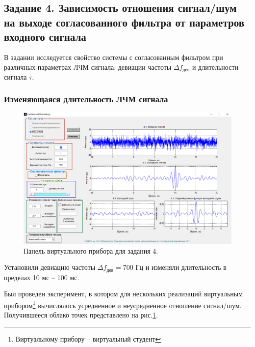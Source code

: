 \subsection{Задание 4. Зависимость отношения сигнал/шум на выходе согласованного
фильтра от параметров входного сигнала}

В задании исследуется свойство системы с согласованным фильтром при различных
параметрах ЛЧМ сигнала: девиации частоты $\Delta f_{\text{дев}}$ и длительности
сигнала $\tau$.




\subsubsection{Изменяющаяся длительность ЛЧМ сигнала}%
\label{ssub:izmeniaiushchaiasia_dlitel_nost_signala_tau_}

\begin{figure}[h!]
    \centering
    \includegraphics[width=\linewidth]{python/task4/t4s4_10_0}
    \caption{Панель виртуального прибора для задания 4.}
    \label{fig:4.1}
\end{figure}

Установили девиацию частоты $\Delta f_{\text{дев}}= 700$ Гц и изменяли
длительность в пределах 10 мс -- 100 мс. 


Был проведен эксперимент, в котором для нескольких реализаций виртуальным
прибором\footnote{Виртуальному прибору -- виртуальный студент}
вычислялось усредненное и неусредненное отношение сигнал/шум. Получившееся
облако точек представлено на рис.\ref{fig:4.1}.



